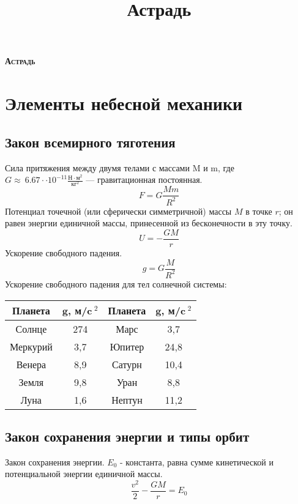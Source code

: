 \documentclass[10pt,a5paper]{article}
\title{Астрадь}
\begin{document}
\begin{titlepage}
	
	\begin{center}
	\vspace*{5 cm}
		{\Huge \bfseries \scshape Астрадь}
	\end{center}
\end{titlepage}

\tableofcontents
\newpage

\section{Элементы небесной механики}

\subsection{Закон всемирного тяготения}

Сила притяжения между двумя телами с массами M и m, где $G\approx\ 6.67\cdot \cdot10^{-11}\frac{\text{Н}\cdot \text{м}^2}{\text{кг}^2}$ --- гравитационная постоянная.$$F=G\frac{Mm}{R^2}$$
Потенциал точечной (или сферически симметричной) массы $M$ в точке $r$; он равен энергии единичной массы, принесенной из бесконечности в эту точку.$$U=-\frac{GM}{r}$$
Ускорение свободного падения.$$g=G\frac{M}{R^2}$$
Ускорение свободного падения для тел солнечной системы:
\begin{table}[h!]
\centering
\begin{tabular}{|c|c|c|c|}
\hline 
\textbf{Планета} & $\mathbf{g}$, \textbf{м/c$~^2$} & \textbf{Планета} & $\mathbf{g}$, \textbf{м/c$~^2$}\\
\hline
Солнце & 274 & Марс & 3,7\\
\hline
Меркурий & 3,7 & Юпитер & 24,8\\
\hline
Венера & 8,9 & Сатурн & 10,4\\
\hline
Земля & 9,8 & Уран & 8,8\\
\hline
Луна & 1,6 & Нептун & 11,2\\
\hline
\end{tabular}
\end{table}
\subsection{Закон сохранения энергии и типы орбит}

Закон сохранения энергии. $E_0$ - константа, равна сумме кинетической и потенциальной энергии единичной массы.$$\frac{v^2}{2}-\frac{GM}{r}=E_0$$
\end{document}

